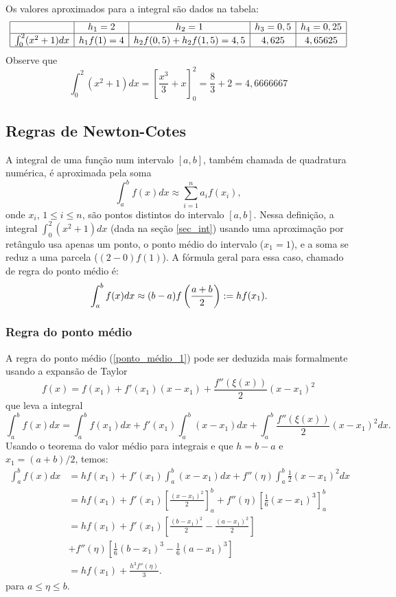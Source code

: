 Os valores aproximados para a integral são dados na tabela:
$$
\begin{array}{|c|c|c|c|c|}
\hline
&h_1=2&h_2=1&h_3=0,5&h_4=0,25\\
\hline
\int_0^2(x^2+1)dx&h_1f(1)=4&h_2f(0,5)+h_2f(1,5)=4,5&4,625&4,65625\\
\hline
\end{array}
$$
Observe que
$$
\int_0^2(x^2+1)dx=\left[\frac{x^3}{3}+x\right]_0^2=\frac{8}{3}+2=4,6666667
$$

\subsection{Regras de Newton-Cotes}

A integral de uma função num intervalo $[a,b]$, também chamada de quadratura numérica, é aproximada pela soma
$$
\int_a^bf(x)dx\approx\sum_{i=1}^na_if(x_i),
$$
onde $x_i$, $1\leq i\leq n$, são pontos distintos do intervalo $[a,b]$. Nessa definição, a integral $\int_0^2(x^2+1)dx$ (dada na seção \ref{sec_int}) usando uma aproximação por retângulo usa apenas um ponto, o ponto médio do intervalo ($x_1=1$), e a soma se reduz a uma parcela ($(2-0)f(1)$). A fórmula geral para essa caso, chamado de regra do ponto médio é:
\begin{equation}{\label{ponto_médio_1}}
\int_a^bf(x)dx\approx (b-a)f\left(\frac{a+b}{2}\right):=hf(x_1).
\end{equation}

\subsubsection{Regra do ponto médio}
A regra do ponto médio (\ref{ponto_médio_1}) pode ser deduzida mais formalmente usando a expansão de Taylor
$$
f(x)=f(x_1)+f'(x_1)(x-x_1)+\frac{f''(\xi(x))}{2}(x-x_1)^2
$$
que leva a integral
$$
\int_a^b f(x)dx=\int_a^b f(x_1) dx+f'(x_1)\int_a^b(x-x_1)dx +\int_a^b\frac{f''(\xi(x))}{2}(x-x_1)^2dx.
$$
Usando o teorema do valor médio para integrais e que $h=b-a$ e $x_1=(a+b)/2$, temos:
\begin{align*}
\int_a^b f(x)dx &= h f(x_1) + f'(x_1)\int_a^b(x-x_1)dx+f''(\eta)\int_a^b\frac{1}{2}(x-x_1)^2dx\\
&= h f(x_1) +f'(x_1)\left[\frac{(x-x_1)^2}{2}\right]_a^b+f''(\eta)\left[\frac{1}{6}(x-x_1)^3\right]_a^b\\
&= h f(x_1) +f'(x_1)\left[\frac{(b-x_1)^2}{2}-\frac{(a-x_1)^2}{2}\right]\\
&+f''(\eta)\left[\frac{1}{6}(b-x_1)^3-\frac{1}{6}(a-x_1)^3\right]\\
&= h f(x_1) +\frac{h^3f''(\eta)}{3}.
\end{align*}
para $a\leq \eta\leq b$.

